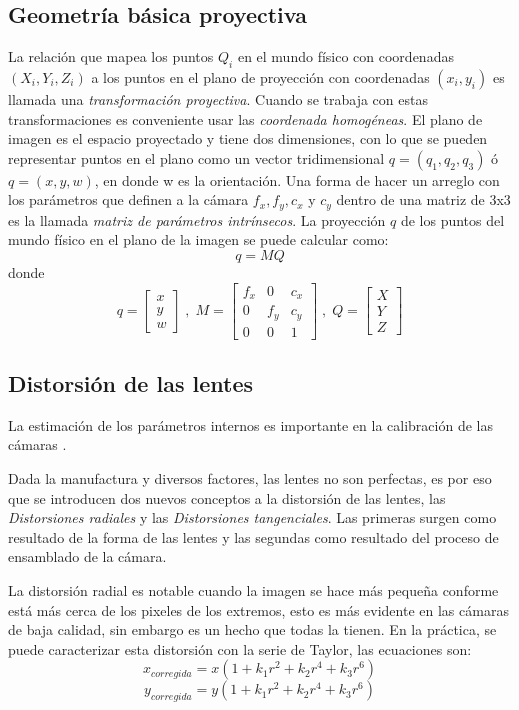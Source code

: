\documentclass{book}
\begin{document}
\subsection{Geometría básica proyectiva}
La relación que mapea los puntos $Q_{i}$ en el mundo físico con coordenadas $(X_{i},Y_{i},Z_{i})$ a los puntos en el plano de proyección con coordenadas $(x_{i},y_{i})$ es llamada una \textit{transformación proyectiva}. Cuando se trabaja con estas transformaciones es conveniente usar las \textit{coordenada homogéneas}. El plano de imagen es el espacio proyectado y tiene dos dimensiones, con lo que se pueden representar puntos en el plano como un vector tridimensional $q=(q_{1},q_{2},q_{3})$ ó $q=(x, y, w)$, en donde w es la orientación. Una forma de hacer un arreglo con los parámetros que definen a la cámara $f_{x},f_{y},c_{x}$ y $c_{y}$ dentro de una matriz de 3x3 es la llamada \textit{matriz de parámetros intrínsecos}. La proyección $q$ de los puntos del mundo físico en el plano de la imagen se puede calcular como: 
\[q=MQ\]
donde
\[q=
\begin{bmatrix}
x\\ 
y\\
w 
\end{bmatrix}\;,\;M=
\begin{bmatrix}
f_{x} & 0 & c_{x}\\ 
0     &f_{y}&c_{y} \\
0     & 0 & 1
\end{bmatrix}\;,\;Q=
\begin{bmatrix}
X\\
Y\\
Z
\end{bmatrix}
\]
\subsection{Distorsión de las lentes}
La estimación de los parámetros internos es importante en la calibración de las cámaras \cite{bradski2008learning}.


Dada la manufactura y diversos factores, las lentes no son perfectas, es por eso que se introducen dos nuevos conceptos a la distorsión de las lentes, las \textit{Distorsiones radiales} y las \textit{Distorsiones tangenciales}. Las primeras surgen como resultado de la forma de las lentes y las segundas como resultado del proceso de ensamblado de la cámara.

La distorsión radial es notable cuando la imagen se hace más pequeña conforme está más cerca de los pixeles de los extremos, esto es más evidente en las cámaras de baja calidad, sin embargo es un hecho que todas la tienen. En la práctica, se puede caracterizar esta distorsión con la serie de Taylor, las ecuaciones son:
\[x_{corregida} = x(1+k_1r^2+k_2r^4+k_3r^6)\]
\[y_{corregida} = y(1+k_1r^2+k_2r^4+k_3r^6)\]
\end{document}
